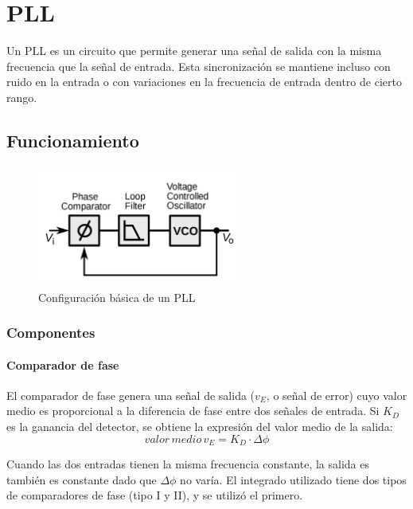 \documentclass[../../tc_tp6_main.tex]{subfiles}
\begin{document}
\chapter{PLL}

Un PLL es un circuito que permite generar una se\~nal de salida con la misma frecuencia que la se\~nal de entrada. Esta sincronizaci\'on se mantiene incluso con ruido en la entrada o con variaciones en la frecuencia de entrada dentro de cierto rango.

\section{Funcionamiento}


\begin{figure}[H]
	\centering 
	\includegraphics[width = 0.6\textwidth]{figures/pll_loop.png}
	\caption{Configuraci\'on b\'asica de un PLL}
	\label{ej2:basic_pll}
\end{figure}

\subsection{Componentes}
\subsubsection{Comparador de fase}
El comparador de fase genera una se\~nal de salida ($v_E$, o se\~nal de error) cuyo valor medio es proporcional a la diferencia de fase entre dos se\~nales de entrada. Si $K_D$ es la ganancia del detector, se obtiene la expresi\'on del valor medio de la salida:
\begin{equation}
	valor \, medio \, v_E = K_D\cdot \Delta \phi
	\label{eq:ej2_salida_comparador}
\end{equation}

Cuando las dos entradas tienen la misma frecuencia constante, la salida es tambi\'en es constante dado que $\Delta \phi$ no var\'ia. El integrado utilizado tiene dos tipos de comparadores de fase (tipo I y II), y se utiliz\'o el primero.
\end{document}
